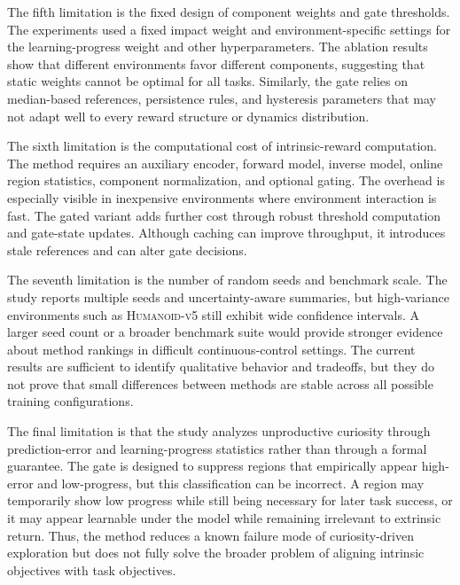 The fifth limitation is the fixed design of component weights and gate thresholds.
The experiments used a fixed impact weight and environment-specific settings for the learning-progress weight and other hyperparameters.
The ablation results show that different environments favor different components, suggesting that static weights cannot be optimal for all tasks.
Similarly, the gate relies on median-based references, persistence rules, and hysteresis parameters that may not adapt well to every reward structure or dynamics distribution.

The sixth limitation is the computational cost of intrinsic-reward computation.
The method requires an auxiliary encoder, forward model, inverse model, online region statistics, component normalization, and optional gating.
The overhead is especially visible in inexpensive environments where environment interaction is fast.
The gated variant adds further cost through robust threshold computation and gate-state updates.
Although caching can improve throughput, it introduces stale references and can alter gate decisions.

The seventh limitation is the number of random seeds and benchmark scale.
The study reports multiple seeds and uncertainty-aware summaries, but high-variance environments such as \textsc{Humanoid-v5} still exhibit wide confidence intervals.
A larger seed count or a broader benchmark suite would provide stronger evidence about method rankings in difficult continuous-control settings.
The current results are sufficient to identify qualitative behavior and tradeoffs, but they do not prove that small differences between methods are stable across all possible training configurations.

The final limitation is that the study analyzes unproductive curiosity through prediction-error and learning-progress statistics rather than through a formal guarantee.
The gate is designed to suppress regions that empirically appear high-error and low-progress, but this classification can be incorrect.
A region may temporarily show low progress while still being necessary for later task success, or it may appear learnable under the model while remaining irrelevant to extrinsic return.
Thus, the method reduces a known failure mode of curiosity-driven exploration but does not fully solve the broader problem of aligning intrinsic objectives with task objectives.